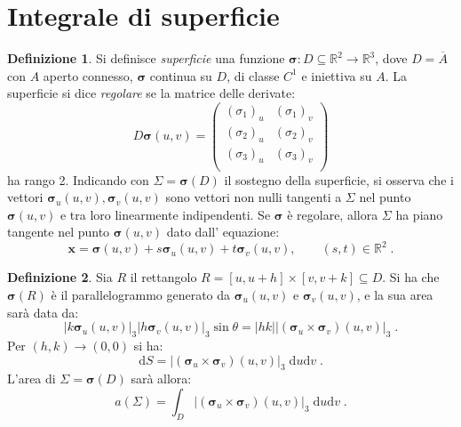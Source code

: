 \documentclass[a4paper,12pt]{report}
\theoremstyle{plain}
\theoremstyle{definition}
\newtheorem{defn}{Definizione}[section]
\theoremstyle{remark}
\newcommand{\diff}[1]{\mathrm{d}#1}
\numberwithin{equation}{section}
\begin{document}
\section{Integrale di superficie}
\begin{defn} Si definisce \textit{superficie} una funzione $\boldsymbol{\sigma}:D\subseteq \mathbb{R}^2\to\mathbb{R}^3$, dove $D=\overline{A}$ con $A$ aperto connesso, $\boldsymbol{\sigma}$ continua su $D$, di classe $C^1$ e iniettiva su $A$. La superficie si dice \textit{regolare} se la matrice delle derivate:
\begin{equation}
D\boldsymbol{\sigma}(u,v)=\left(\begin{matrix}
                                 (\sigma_1)_u & (\sigma_1)_v \\
(\sigma_2)_u & (\sigma_2)_v \\
(\sigma_3)_u & (\sigma_3)_v \\
                                \end{matrix}\right)
\end{equation}
ha rango 2. Indicando con $\Sigma=\boldsymbol{\sigma}(D)$ il sostegno della superficie, si osserva che i vettori $\boldsymbol{\sigma}_u(
u,v),\boldsymbol{\sigma}_v(u,v)$ sono vettori non nulli tangenti a $\Sigma$ nel punto $\boldsymbol{\sigma}(u,v)$ e tra loro linearmente 
indipendenti. Se $\boldsymbol{\sigma}$ è regolare, allora $\Sigma$ ha piano tangente nel punto $\boldsymbol{\sigma}(u,v)$ dato dall'
equazione:
\begin{equation}
\mathbf{x}=\boldsymbol{\sigma}(u,v)+s\boldsymbol{\sigma}_u(u,v)+t\boldsymbol{\sigma}_v(u,v),\qquad (s,t)\in\mathbb{R}^2\;.
\end{equation}
\end{defn}
\begin{defn} Sia $R$ il rettangolo $R=[u,u+h]\times[v,v+k]\subseteq D$. Si ha che $\boldsymbol{\sigma}(R)$ è il parallelogrammo generato da $\boldsymbol{\sigma}_u(u,v)$ e $\boldsymbol{\sigma}_v(u,v)$, e la sua area sarà data da:
\begin{equation}
|k\boldsymbol{\sigma}_u(u,v)|_3|h\boldsymbol{\sigma}_v(u,v)|_3\sin\theta=|hk||(\boldsymbol{\sigma}_u\times\boldsymbol{\sigma}_v)(u,v)|_3\;.
\end{equation}
Per $(h,k)\to(0,0)$ si ha:
\begin{equation}
\diff{S}=|(\boldsymbol{\sigma}_u\times\boldsymbol{\sigma}_v)(u,v)|_3\;\diff{u}\diff{v}\;.
\end{equation}
L'area di $\Sigma=\boldsymbol{\sigma}(D)$ sarà allora:
\begin{equation}
a(\Sigma)=\int_D |(\boldsymbol{\sigma}_u\times\boldsymbol{\sigma}_v)(u,v)|_3\;\diff{u}\diff{v}\;.
\end{equation}
\end{defn}
\end{document}
